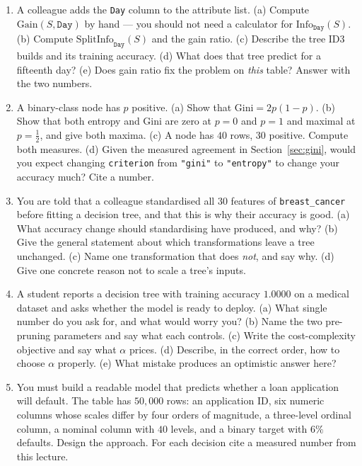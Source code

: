\documentclass[11pt]{article}
\begin{document}
\begin{enumerate}[leftmargin=*]
  \item\label{q:day} A colleague adds the \texttt{Day} column to the attribute
    list. (a) Compute $\mathrm{Gain}(S, \texttt{Day})$ by hand --- you should
    not need a calculator for $\mathrm{Info}_{\texttt{Day}}(S)$. (b) Compute
    $\mathrm{SplitInfo}_{\texttt{Day}}(S)$ and the gain ratio. (c) Describe
    the tree ID3 builds and its training accuracy. (d) What does that tree
    predict for a fifteenth day? (e) Does gain ratio fix the problem on
    \emph{this} table? Answer with the two numbers.

  \item\label{q:gini} A binary-class node has $p$ positive. (a) Show that
    $\mathrm{Gini} = 2p(1-p)$. (b) Show that both entropy and Gini are zero at
    $p=0$ and $p=1$ and maximal at $p=\tfrac12$, and give both maxima.
    (c) A node has $40$ rows, $30$ positive. Compute both measures.
    (d) Given the measured agreement in Section~\ref{sec:gini}, would you
    expect changing \texttt{criterion} from \texttt{"gini"} to
    \texttt{"entropy"} to change your accuracy much? Cite a number.

  \item\label{q:scale} You are told that a colleague standardised all $30$
    features of \texttt{breast\_cancer} before fitting a decision tree, and
    that this is why their accuracy is good. (a) What accuracy change should
    standardising have produced, and why? (b) Give the general statement about
    which transformations leave a tree unchanged. (c) Name one transformation
    that does \emph{not}, and say why. (d) Give one concrete reason not to
    scale a tree's inputs.

  \item\label{q:overfit} A student reports a decision tree with training
    accuracy $1.0000$ on a medical dataset and asks whether the model is
    ready to deploy. (a) What single number do you ask for, and what would
    worry you? (b) Name the two pre-pruning parameters and say what each
    controls. (c) Write the cost-complexity objective and say what $\alpha$
    prices. (d) Describe, in the correct order, how to choose $\alpha$
    properly. (e) What mistake produces an optimistic answer here?

  \item\label{q:design} You must build a readable model that predicts whether
    a loan application will default. The table has $50{,}000$ rows: an
    application ID, six numeric columns whose scales differ by four orders of
    magnitude, a three-level ordinal column, a nominal column with $40$
    levels, and a binary target with $6\%$ defaults. Design the approach.
    For each decision cite a measured number from this lecture.
\end{enumerate}
\end{document}
